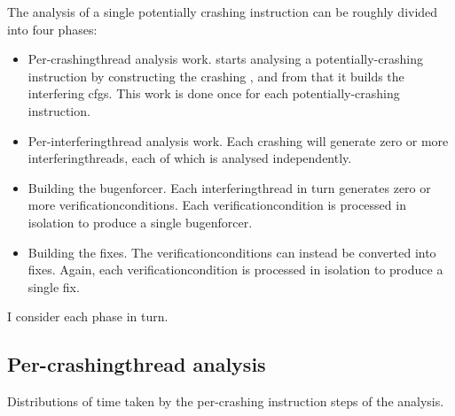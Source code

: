 The analysis of a single potentially crashing instruction can be
roughly divided into four phases:
\begin{itemize}
\item Per-\gls{crashingthread} analysis work.  {\Technique} starts
  analysing a potentially-crashing instruction by constructing the
  crashing {\StateMachine}, and from that it builds the interfering
  \glspl{cfg}.  This work is done once for each potentially-crashing
  instruction.
\item Per-\gls{interferingthread} analysis work.  Each crashing
  {\StateMachine} will generate zero or more
  \glspl{interferingthread}, each of which is analysed independently.
\item Building the \gls{bugenforcer}.  Each \gls{interferingthread} in
  turn generates zero or more \glspl{verificationcondition}.  Each
  \gls{verificationcondition} is processed in isolation to produce a
  single \gls{bugenforcer}.
\item Building the fixes.  The \glspl{verificationcondition} can
  instead be converted into fixes.  Again, each
  \gls{verificationcondition} is processed in isolation to produce a
  single fix.
\end{itemize}
I consider each phase in turn.

\subsection{Per-\gls{crashingthread} analysis}

\begin{sanefig}
  \caption{Distributions of time taken by the per-crashing instruction
    steps of the analysis.}
  \label{fig:eval:how:per_crashing_times}
\end{sanefig}

